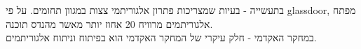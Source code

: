 בתעשייה - בעיות שמצריכות פתרון אלגוריתמי צצות במגוון תחומים. על פי
\textenglish{glassdoor}, 
מפתח אלגוריתמים מרוויח 20 אחוז יותר מאשר מהנדס תוכנה.
\\
במחקר האקדמי - חלק עיקרי של המחקר האקדמי הוא בפיתוח וניתוח אלגוריתמים.

